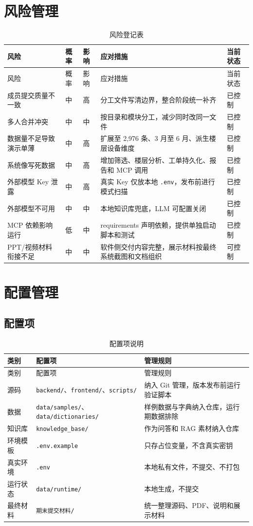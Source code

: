 \documentclass[12pt,a4paper]{ctexart}
\newcommand{\code}[1]{{\footnotesize\nolinkurl{#1}}}
\begin{document}
\section{风险管理}
\begin{longtable}{p{3.2cm}p{1.6cm}p{1.6cm}p{5.2cm}p{2.3cm}}
\caption{风险登记表}\\
\toprule
风险 & 概率 & 影响 & 应对措施 & 当前状态 \\
\midrule
\endfirsthead
\toprule
风险 & 概率 & 影响 & 应对措施 & 当前状态 \\
\midrule
\endhead
成员提交质量不一致 & 中 & 高 & 分工文件写清边界，整合阶段统一补齐 & 已控制 \\
多人合并冲突 & 中 & 中 & 按目录和模块分工，减少同时改同一文件 & 已控制 \\
数据量不足导致演示单薄 & 中 & 高 & 扩展至 2,976 条、3 月至 6 月、派生楼层设备维度 & 已控制 \\
系统像写死数据 & 中 & 高 & 增加筛选、楼层分析、工单持久化、报告和 MCP 调用 & 已控制 \\
外部模型 Key 泄露 & 中 & 高 & 真实 Key 仅放本地 \code{.env}，发布前进行模式扫描 & 已控制 \\
外部模型不可用 & 中 & 中 & 本地知识库兜底，LLM 可配置关闭 & 已控制 \\
MCP 依赖影响运行 & 低 & 中 & requirements 声明依赖，提供单独启动脚本和测试 & 已控制 \\
PPT/视频材料衔接不足 & 中 & 中 & 软件侧交付内容完整，展示材料按最终系统截图和文档组织 & 可控制 \\
\bottomrule
\end{longtable}

\section{配置管理}
\subsection{配置项}
\begin{longtable}{p{3.5cm}p{5cm}p{5.2cm}}
\caption{配置项说明}\\
\toprule
类别 & 配置项 & 管理规则 \\
\midrule
\endfirsthead
\toprule
类别 & 配置项 & 管理规则 \\
\midrule
\endhead
源码 & \code{backend/}、\code{frontend/}、\code{scripts/} & 纳入 Git 管理，版本发布前运行验证脚本 \\
数据 & \code{data/samples/}、\code{data/dictionaries/} & 样例数据与字典纳入仓库，运行期数据排除 \\
知识库 & \code{knowledge_base/} & 作为问答和 RAG 素材纳入仓库 \\
环境模板 & \code{.env.example} & 只存占位变量，不含真实密钥 \\
真实环境 & \code{.env} & 本地私有文件，不提交、不打包 \\
运行状态 & \code{data/runtime/} & 本地生成，不提交 \\
最终材料 & \code{期末提交材料/} & 统一整理源码、PDF、说明和展示材料 \\
\bottomrule
\end{longtable}
\end{document}

